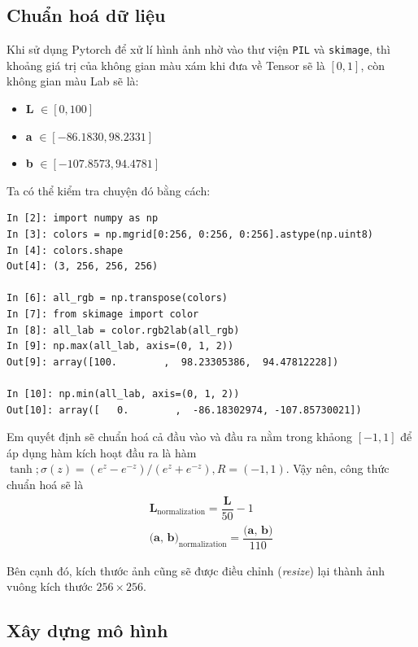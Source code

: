 \documentclass[a4paper]{article}
\begin{document}
\subsection{Chuẩn hoá dữ liệu}\label{normalization}
\noindent
Khi sử dụng Pytorch để xử lí hình ảnh nhờ vào thư viện \texttt{PIL} và \texttt{skimage}, thì khoảng giá trị của không gian màu xám khi đưa về Tensor sẽ là $[0, 1]$, còn không gian màu Lab sẽ là:

\begin{itemize}
    \item \textbf{L} $\in [0, 100]$
    
    \item \textbf{a} $\in [-86.1830, 98.2331]$
    
    \item \textbf{b} $\in [-107.8573, 94.4781]$
\end{itemize}

\noindent
Ta có thể kiểm tra chuyện đó bằng cách:
\begin{lstlisting}
In [2]: import numpy as np
In [3]: colors = np.mgrid[0:256, 0:256, 0:256].astype(np.uint8)
In [4]: colors.shape
Out[4]: (3, 256, 256, 256)

In [6]: all_rgb = np.transpose(colors)
In [7]: from skimage import color
In [8]: all_lab = color.rgb2lab(all_rgb)
In [9]: np.max(all_lab, axis=(0, 1, 2))
Out[9]: array([100.        ,  98.23305386,  94.47812228])

In [10]: np.min(all_lab, axis=(0, 1, 2))
Out[10]: array([   0.        ,  -86.18302974, -107.85730021])
\end{lstlisting}

\noindent
Em quyết định sẽ chuẩn hoá cả đầu vào và đầu ra nằm trong khảong $[-1, 1]$ để áp dụng hàm kích hoạt đầu ra là hàm $\tanh; \sigma(z) = \left(e^z-e^{-z}\right)/\left(e^z+e^{-z}\right), R = (-1, 1)$. Vậy nên, công thức chuẩn hoá sẽ là
\begin{align*}
    \textbf{L}_{\text{normalization}} = \dfrac{\textbf{L}}{50} - 1\\
    \textbf{(a, b)}_{\text{normalization}} = \dfrac{\textbf{(a, b)}}{110}
\end{align*}

\noindent
Bên cạnh đó, kích thước ảnh cũng sẽ được điều chỉnh (\textit{resize}) lại thành ảnh vuông kích thước $256\times 256$.

\subsection{Xây dựng mô hình}\label{buildmodel}
\end{document}
